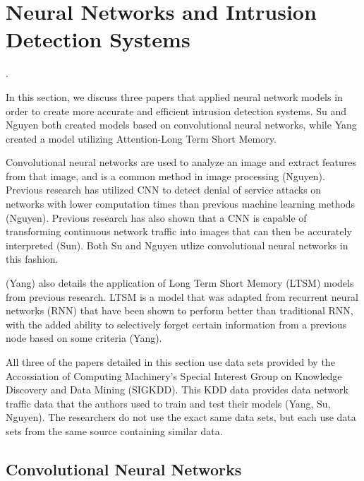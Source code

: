 \section{Neural Networks and Intrusion Detection Systems}
. 

In this section, we discuss three papers that applied neural network models in order to create more accurate and efficient intrusion detection systems.  Su and Nguyen both created models based on convolutional neural networks, while Yang created a model utilizing Attention-Long Term Short Memory. 

Convolutional neural networks are used to analyze an image and extract features from that image, and is a common method in image processing (Nguyen). Previous research has utilized CNN to detect denial of service attacks on networks with lower computation times than previous machine learning methods (Nguyen). Previous research has also shown that a CNN is capable of transforming continuous network traffic into images that can then be accurately interpreted (Sun). Both Su and Nguyen utlize convolutional neural networks in this fashion. 

(Yang) also details the application of Long Term Short Memory (LTSM) models from previous research. LTSM is a model that was adapted from recurrent neural networks (RNN) that have been shown to perform better than traditional RNN, with the added ability to selectively forget certain information from a previous node based on some criteria (Yang).

All three of the papers detailed in this section use data sets provided by the Accossiation of Computing Machinery’s Special Interest Group on Knowledge Discovery and Data Mining (SIGKDD). This KDD data provides data network traffic data that the authors used to train and test their models (Yang, Su, Nguyen).  The researchers do not use the exact same data sets, but each use data sets from the same source containing similar data. 


\subsection{Convolutional Neural Networks}

